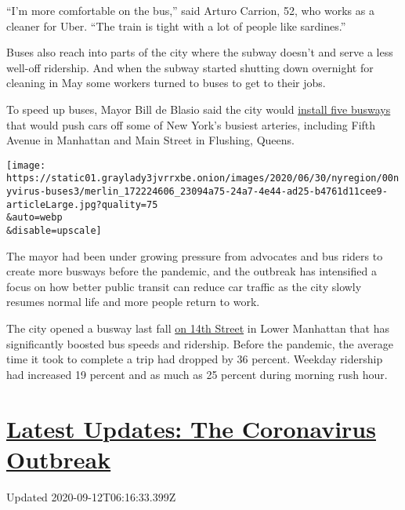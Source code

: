 ``I'm more comfortable on the bus,'' said Arturo Carrion, 52, who works
as a cleaner for Uber. ``The train is tight with a lot of people like
sardines.''

Buses also reach into parts of the city where the subway doesn't and
serve a less well-off ridership. And when the subway started shutting
down overnight for cleaning in May some workers turned to buses to get
to their jobs.

To speed up buses, Mayor Bill de Blasio said the city would
\href{https://www.nytimes3xbfgragh.onion/2020/06/08/nyregion/coronavirus-nyc-reopen-phase-1.html}{install
five busways} that would push cars off some of New York's busiest
arteries, including Fifth Avenue in Manhattan and Main Street in
Flushing, Queens.

\texttt{[image: https://static01.graylady3jvrrxbe.onion/images/2020/06/30/nyregion/00nyvirus-buses3/merlin\_172224606\_23094a75-24a7-4e44-ad25-b4761d11cee9-articleLarge.jpg?quality=75\\\&auto=webp\\\&disable=upscale]}

The mayor had been under growing pressure from advocates and bus riders
to create more busways before the pandemic, and the outbreak has
intensified a focus on how better public transit can reduce car traffic
as the city slowly resumes normal life and more people return to work.

The city opened a busway last fall
\href{https://www.nytimes3xbfgragh.onion/2019/10/03/nyregion/car-ban-14th-street-manhattan.html}{on
14th Street} in Lower Manhattan that has significantly boosted bus
speeds and ridership. Before the pandemic, the average time it took to
complete a trip had dropped by 36 percent. Weekday ridership had
increased 19 percent and as much as 25 percent during morning rush hour.

\hypertarget{latest-updates-the-coronavirus-outbreak}{%
\section{\texorpdfstring{\href{https://www.nytimes3xbfgragh.onion/2020/09/11/world/covid-19-coronavirus.html?action=click\&pgtype=Article\&state=default\&region=MAIN_CONTENT_1\&context=storylines_live_updates}{Latest
Updates: The Coronavirus
Outbreak}}{Latest Updates: The Coronavirus Outbreak}}\label{latest-updates-the-coronavirus-outbreak}}

Updated 2020-09-12T06:16:33.399Z

